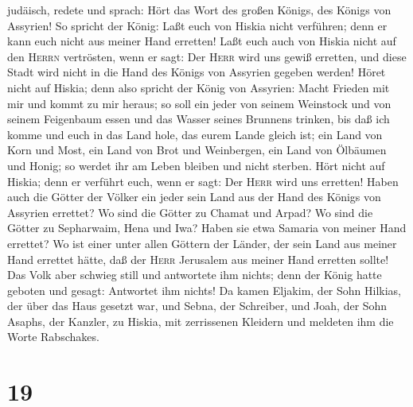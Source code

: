 judäisch, redete und sprach: Hört das Wort des großen Königs, des Königs
von Assyrien!  So spricht der König: Laßt euch von Hiskia
nicht verführen; denn er kann euch nicht aus meiner Hand erretten!
 Laßt euch auch von Hiskia nicht auf den \textsc{Herrn}
vertrösten, wenn er sagt: Der \textsc{Herr} wird uns gewiß erretten, und
diese Stadt wird nicht in die Hand des Königs von Assyrien gegeben
werden!  Höret nicht auf Hiskia; denn also spricht der
König von Assyrien: Macht Frieden mit mir und kommt zu mir heraus; so
soll ein jeder von seinem Weinstock und von seinem Feigenbaum essen und
das Wasser seines Brunnens trinken,  bis daß ich komme
und euch in das Land hole, das eurem Lande gleich ist; ein Land von Korn
und Most, ein Land von Brot und Weinbergen, ein Land von Ölbäumen und
Honig; so werdet ihr am Leben bleiben und nicht sterben. Hört nicht auf
Hiskia; denn er verführt euch, wenn er sagt: Der \textsc{Herr} wird uns
erretten!  Haben auch die Götter der Völker ein jeder
sein Land aus der Hand des Königs von Assyrien errettet? 
Wo sind die Götter zu Chamat und Arpad? Wo sind die Götter zu
Sepharwaim, Hena und Iwa? Haben sie etwa Samaria von meiner Hand
errettet?  Wo ist einer unter allen Göttern der Länder,
der sein Land aus meiner Hand errettet hätte, daß der \textsc{Herr}
Jerusalem aus meiner Hand erretten sollte!  Das Volk aber
schwieg still und antwortete ihm nichts; denn der König hatte geboten
und gesagt: Antwortet ihm nichts!  Da kamen Eljakim, der
Sohn Hilkias, der über das Haus gesetzt war, und Sebna, der Schreiber,
und Joah, der Sohn Asaphs, der Kanzler, zu Hiskia, mit zerrissenen
Kleidern und meldeten ihm die Worte Rabschakes.

\hypertarget{section-18}{%
\section{19}\label{section-18}}


